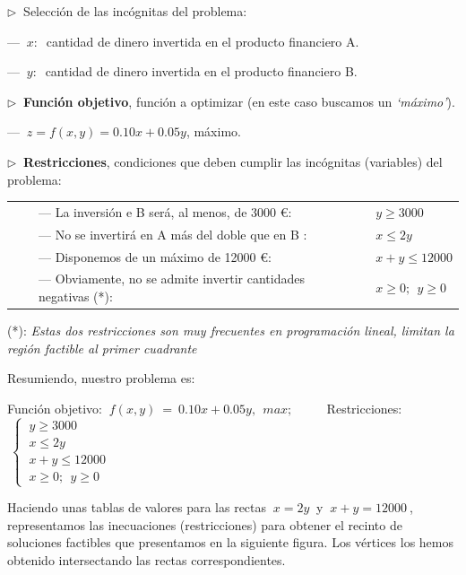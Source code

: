 \vspace{5mm}
$\triangleright \ $ Selección de las incógnitas del problema: 

\hspace{1cm} --- $\ x:\ $ cantidad de dinero invertida en el producto financiero A.

\hspace{1cm} --- $\ y:\ $ cantidad de dinero invertida en el producto financiero B.

$\triangleright \ $ \textbf{Función objetivo}, función a optimizar (en este caso buscamos un \emph{`máximo'}).

\hspace{1cm} --- $\ z=f(x,y)=0.10x+0.05y$, máximo.

$\triangleright \ $ \textbf{Restricciones}, condiciones que deben cumplir las incógnitas (variables) del problema:

\begin{table}[H]
\begin{tabular}{lll}
$\quad$& --- La inversión e B será, al menos, de 3000 \euro :& $\quad y\ge 3000$ \\
$\quad$& --- No se invertirá en A más del doble que en B :& $\quad x\le 2y$ \\
$\quad$& --- Disponemos de un máximo de 12000 \euro :& $\quad x+y\le 12000$
\\ $\quad$ & \small{--- Obviamente, no se admite invertir cantidades negativas (*):} &$\quad x\ge 0;\ \ y\ge 0$
\end{tabular}
\end{table}

(*): \normalsize{\emph{ Estas dos restricciones son muy frecuentes en programación lineal, limitan la región factible al primer cuadrante}}


\vspace{4mm} \normalsize{Resumiendo, nuestro problema es:}

\begin{destacado}
Función objetivo: $\ f(x,y)\ =\ 0.10x+0.05y,\ \  max; $
$\qquad$
Restricciones: $\ \begin{cases}
\ y\ge 3000 \\
\ x\le 2y \\
\ x+y\le 12000 \\
\ x\ge 0;\ \ y\ge 0	
\end{cases}$	
\end{destacado}

Haciendo unas tablas de valores para las rectas $\ x=2y\ $ y $\ x+y=12000\ $, representamos las inecuaciones (restricciones) para obtener el recinto de soluciones factibles que presentamos en la siguiente figura. Los vértices los hemos obtenido intersectando las rectas correspondientes.




